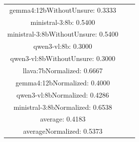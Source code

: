 \documentclass[a4paper]{article}
\begin{document}
\begin{tabular}{ccc}
gemma4:12bWithoutUnsure: 0.3333 \\ ministral-3:8b: 0.5400 \\ ministral-3:8bWithoutUnsure: 0.5400 \\ qwen3-vl:8b: 0.3000 \\ qwen3-vl:8bWithoutUnsure: 0.3000 \\ llava:7bNormalized: 0.6667 \\ gemma4:12bNormalized: 0.4000 \\ qwen3-vl:8bNormalized: 0.4286 \\ ministral-3:8bNormalized: 0.6538 \\ average: 0.4183 \\ averageNormalized: 0.5373 \end{minipage}\\
\end{tabular}

\vspace{5mm}
\end{document}
